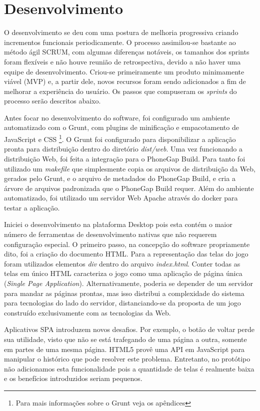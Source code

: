\section{Desenvolvimento}

O desenvolvimento se deu com uma postura de melhoria progressiva criando
incrementos funcionais periodicamente. O processo assimilou-se bastante
ao método ágil SCRUM, com algumas diferenças notáveis, os tamanhos dos sprints
foram flexíveis e não houve reunião de retrospectiva, devido a não
haver uma equipe de desenvolvimento. Criou-se primeiramente um produto
minimamente viável (MVP) e, a partir dele, novos recursos foram
sendo adicionados a fim de melhorar a experiência do usuário. Os 
passos que compuseram  os \textit{sprints} do processo serão descritos abaixo.

Antes focar no desenvolvimento do software, foi configurado um ambiente
automatizado com o Grunt, com plugins de minificação e empacotamento
de JavaScript e CSS \footnote{Para mais informações sobre o Grunt
veja os apêndices}. O Grunt foi configurado para disponibilizar a
aplicação pronta para distribuição dentro do diretório \textit{dist/web}.
Uma vez funcionando a distribuição Web, foi feita a integração para
o PhoneGap Build. Para tanto foi utilizado um \textit{makefile} que
simplesmente copia os arquivos de distribuição da Web, gerados pelo
Grunt, e o arquivo de metadados do PhoneGap Build, e cria a árvore de
arquivos padronizada que o PhoneGap Build requer. Além do ambiente
automatizado, foi utilizado um servidor Web Apache através do docker
para testar a aplicação.

Iniciei o desenvolvimento na plataforma Desktop pois esta contém
o maior número de ferramentas de desenvolvimento nativas que não
requerem configuração especial. O primeiro passo, na concepção
do software propriamente dito, foi a criação do documento HTML.
Para a representação das telas do jogo foram utilizados elementos
\textit{div} dentro do arquivo \textit{index.html}. Conter todas
as telas em único HTML caracteriza o jogo como uma aplicação de
página única (\textit{Single Page Application}). Alternativamente,
poderia se depender de um servidor para mandar as páginas prontas,
mas isso distribui a complexidade do sistema para tecnologias do
lado do servidor, distanciando-se da proposta de um jogo construído
exclusivamente com as tecnologias da Web.

Aplicativos SPA introduzem novos desafios. Por exemplo, o botão
de voltar perde sua utilidade, visto que não se está trafegando
de uma página a outra, somente em partes de uma mesma página. HTML5
provê uma API em JavaScript para manipular o histórico que pode
resolver este problema. Entretanto, no protótipo não adicionamos
esta funcionalidade pois a quantidade de telas é realmente baixa e os
benefícios introduzidos seriam pequenos.

